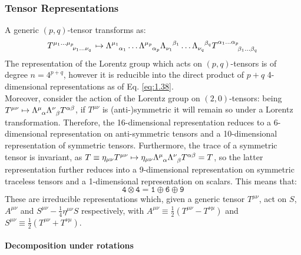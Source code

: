\subsubsection{Tensor Representations}

A generic $ (p,q) $-tensor transforms as:
\begin{equation}
  \tensor{T}{^{\mu_1 \dots \mu_p}_{\nu_1 \dots \nu_q}} \mapsto \tensor{\Lambda}{^{\mu_1}_{\alpha_1}} \dots \tensor{\Lambda}{^{\mu_p}_{\alpha_p}} \tensor{\Lambda}{_{\nu_1}^{\beta_1}} \dots \tensor{\Lambda}{_{\nu_q}^{\beta_q}} \tensor{T}{^{\alpha_1 \dots \alpha_p}_{\beta_1 \dots \beta_q}}
  \label{eq:1.37}
\end{equation}
The representation of the Lorentz group which acts on $ (p,q) $-tensors is of degree $ n = 4^{p + q} $, however it is reducible into the direct product of $ p + q $ 4-dimensional representations as of Eq. \ref{eq:1.38}.\\
Moreover, consider the action of the Lorentz group on $ (2,0) $-tensors: being $ T^{\mu \nu} \mapsto \tensor{\Lambda}{^\mu_\alpha} \tensor{\Lambda}{^\nu_\beta} T^{\alpha \beta} $, if $ T^{\mu \nu} $ is (anti-)symmetric it will remain so under a Lorentz transformation. Therefore, the 16-dimensional representation reduces to a 6-dimensional representation on anti-symmetric tensors and a 10-dimensional representation of symmetric tensors. Furthermore, the trace of a symmetric tensor is invariant, as $ T \equiv \eta_{\mu \nu} T^{\mu \nu} \mapsto \eta_{\mu \nu} \tensor{\Lambda}{^\mu _\alpha} \tensor{\Lambda}{^\nu _\beta} T^{\alpha \beta} = T $, so the latter representation further reduces into a 9-dimensional representation on symmetric traceless tensors and a 1-dimensional representation on scalars. This means that:
\begin{equation}
  \mathtt{4} \otimes \mathtt{4} = \mathtt{1} \oplus \mathtt{6} \oplus \mathtt{9}
  \label{eq:1.38}
\end{equation}
These are irreducible representations which, given a generic tensor $ T^{\mu \nu} $, act on $ S $, $ A^{\mu \nu} $ and $ S^{\mu \nu} - \frac{1}{4} \eta^{\mu \nu} S $ respectively, with $ A^{\mu \nu} \equiv \frac{1}{2} \left( T^{\mu \nu} - T^{\nu \mu} \right) $ and $ S^{\mu \nu} \equiv \frac{1}{2} \left( T^{\mu \nu} + T^{\nu \mu} \right) $.

\paragraph{Decomposition under rotations}

